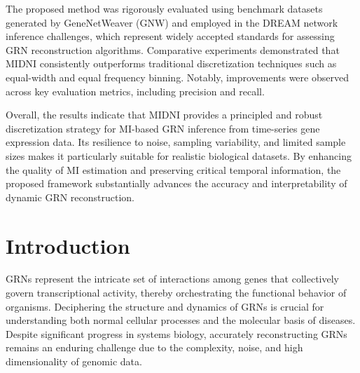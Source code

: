 The proposed method was rigorously evaluated using benchmark datasets generated by GeneNetWeaver (GNW) and employed in the DREAM network inference challenges, which represent widely accepted standards for assessing GRN reconstruction algorithms. Comparative experiments demonstrated that MIDNI consistently outperforms traditional discretization techniques such as equal-width and equal frequency binning. Notably, improvements were observed across key evaluation metrics, including precision and recall.

Overall, the results indicate that MIDNI provides a principled and robust discretization strategy for MI-based GRN inference from time-series gene expression data. Its resilience to noise, sampling variability, and limited sample sizes makes it particularly suitable for realistic biological datasets. By enhancing the quality of MI estimation and preserving critical temporal information, the proposed framework substantially advances the accuracy and interpretability of dynamic GRN reconstruction.


\section{Introduction}\label{chapter2_introduction}
GRNs represent the intricate set of interactions among genes that collectively govern transcriptional activity, thereby orchestrating the functional behavior of organisms. Deciphering the structure and dynamics of GRNs is crucial for understanding both normal cellular processes and the molecular basis of diseases. Despite significant progress in systems biology, accurately reconstructing GRNs remains an enduring challenge due to the complexity, noise, and high dimensionality of genomic data.

